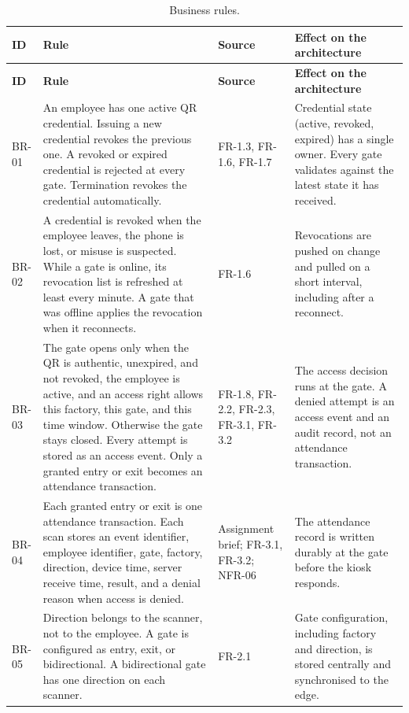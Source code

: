 \begin{longtable}{@{}L{1.25cm}L{5.15cm}L{4.05cm}L{4.15cm}@{}}
\caption{Business rules.}
\label{tab:br}\\
\toprule
\textbf{ID} & \textbf{Rule} & \textbf{Source} & \textbf{Effect on the architecture}\\
\midrule
\endfirsthead
\toprule
\textbf{ID} & \textbf{Rule} & \textbf{Source} & \textbf{Effect on the architecture}\\
\midrule
\endhead
BR-01 &
An employee has one active QR credential.
Issuing a new credential revokes the previous one.
A revoked or expired credential is rejected at every gate.
Termination revokes the credential automatically. &
FR-1.3, FR-1.6, FR-1.7 &
Credential state (active, revoked, expired) has a single owner.
Every gate validates against the latest state it has received.\\
\addlinespace
BR-02 &
A credential is revoked when the employee leaves, the phone is lost, or misuse is suspected.
While a gate is online, its revocation list is refreshed at least every minute.
A gate that was offline applies the revocation when it reconnects. &
FR-1.6 &
Revocations are pushed on change and pulled on a short interval, including after a reconnect.\\
\addlinespace
BR-03 &
The gate opens only when the QR is authentic, unexpired, and not revoked, the employee is active, and an access right allows this factory, this gate, and this time window.
Otherwise the gate stays closed.
Every attempt is stored as an access event.
Only a granted entry or exit becomes an attendance transaction. &
FR-1.8, FR-2.2, FR-2.3, FR-3.1, FR-3.2 &
The access decision runs at the gate.
A denied attempt is an access event and an audit record, not an attendance transaction.\\
\addlinespace
BR-04 &
Each granted entry or exit is one attendance transaction.
Each scan stores an event identifier, employee identifier, gate, factory, direction, device time, server receive time, result, and a denial reason when access is denied. &
Assignment brief; FR-3.1, FR-3.2; NFR-06 &
The attendance record is written durably at the gate before the kiosk responds.\\
\addlinespace
BR-05 &
Direction belongs to the scanner, not to the employee.
A gate is configured as entry, exit, or bidirectional.
A bidirectional gate has one direction on each scanner. &
FR-2.1 &
Gate configuration, including factory and direction, is stored centrally and synchronised to the edge.\\

\end{longtable}
